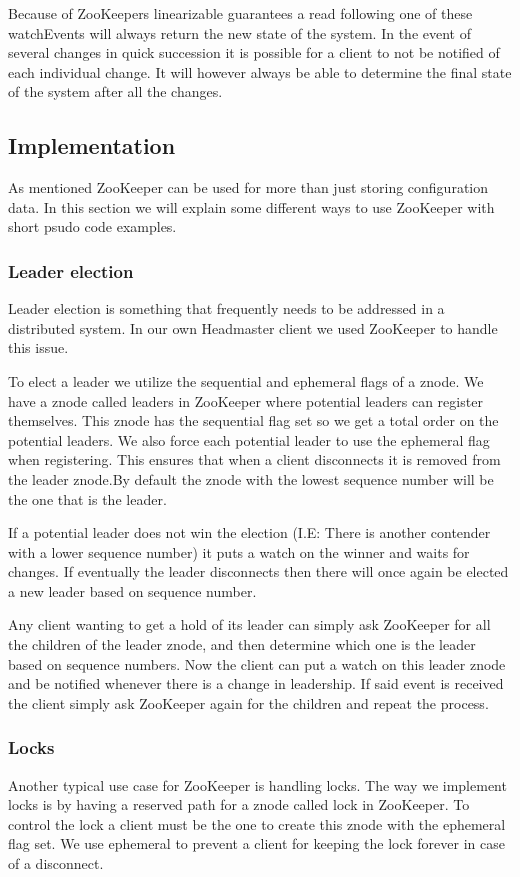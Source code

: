 Because of ZooKeepers linearizable guarantees a read following one of these watchEvents will always return the new state of the system. In the event of several changes in quick succession it is possible for a client to not be notified of each individual change. It will however always be able to determine the final state of the system after all the changes.

\subsection{Implementation}

As mentioned ZooKeeper can be used for more than just storing configuration data. In this section we will explain some different ways to use ZooKeeper with short psudo code examples. 


\subsubsection{Leader election}
Leader election is something that frequently needs to be addressed in a distributed system. In our own Headmaster client we used ZooKeeper to handle this issue. 

To elect a leader we utilize the sequential and ephemeral flags of a znode. We have a znode called leaders in ZooKeeper where potential leaders can register themselves. This znode has the sequential flag set so we get a total order on the potential leaders. We also force each potential leader to use the ephemeral flag when registering. This ensures that when a client disconnects it is removed from the leader znode.By default the znode with the lowest sequence number will be the one that is the leader.

If a potential leader does not win the election (I.E: There is another contender with a lower sequence number) it puts a watch on the winner and waits for changes. If eventually the leader disconnects then there will once again be elected a new leader based on sequence number.

Any client wanting to get a hold of its leader can simply ask ZooKeeper for all the children of the leader znode, and then determine which one is the leader based on sequence numbers. Now the client can put a watch on this leader znode and be notified whenever there is a change in leadership. If said event is received the client simply ask ZooKeeper again for the children and repeat the process.

\subsubsection{Locks}
Another typical use case for ZooKeeper is handling locks. The way we implement locks is by having a reserved path for a znode called lock in ZooKeeper. To control the lock a client must be the one to create this znode with the ephemeral flag set. We use ephemeral to prevent a client for keeping the lock forever in case of a disconnect. 


